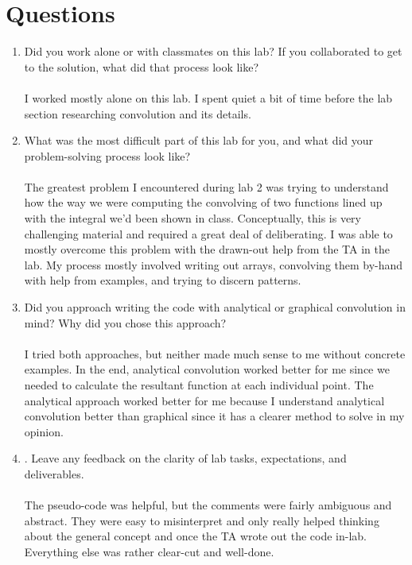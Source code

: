 \documentclass[12pt]{report}
\begin{document}
\section{Questions} %
    \begin{enumerate}
        \item Did you work alone or with classmates on this lab? If you collaborated to get to the solution, what did that process look like?
        \paragraph{} I worked mostly alone on this lab. I spent quiet a bit of time before the lab section researching convolution and its details. 
        \item What was the most difficult part of this lab for you, and what did your problem-solving process look like?
            \paragraph{} The greatest problem I encountered during lab 2 was trying to understand how the way we were computing the convolving of two functions lined up with the integral we'd been shown in class. Conceptually, this is very challenging material and required a great deal of deliberating. I was able to mostly overcome this problem with the drawn-out help from the TA in the lab. My process mostly involved writing out arrays, convolving them by-hand with help from examples, and trying to discern patterns. 
        \item Did you approach writing the code with analytical or graphical convolution in mind? Why did you chose this approach?
            \paragraph{} I tried both approaches, but neither made much sense to me without concrete examples. In the end, analytical convolution worked better for me since we needed to calculate the resultant function at each individual point. The analytical approach worked better for me because I understand analytical convolution better than graphical since it has a clearer method to solve in my opinion. 
        \item . Leave any feedback on the clarity of lab tasks, expectations, and deliverables.
            \paragraph{} The pseudo-code was helpful, but the comments were fairly ambiguous and abstract. They were easy to misinterpret and only really helped thinking about the general concept and once the TA wrote out the code in-lab. Everything else was rather clear-cut and well-done. 
    \end{enumerate}
\end{document}
